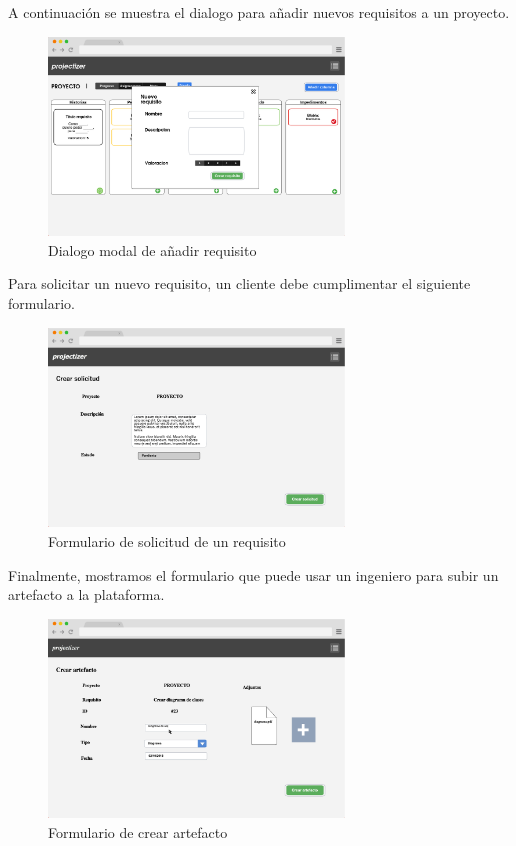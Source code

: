 \documentclass[a4paper, spanish]{article}
\begin{document}
A continuación se muestra el dialogo para añadir nuevos requisitos a un proyecto.
\begin{figure}[h!]
\centering
\includegraphics[width=0.7\textwidth]{maquetas/requisitos.png}
\caption{Dialogo modal de añadir requisito}\label{fig:maquetarequisito}
\end{figure}

Para solicitar un nuevo requisito, un cliente debe cumplimentar el siguiente formulario.
\begin{figure}[h!]
\centering
\includegraphics[width=0.7\textwidth]{maquetas/solicitudes.png}
\caption{Formulario de solicitud de un requisito}\label{fig:maquetasolicitud}
\end{figure}

Finalmente, mostramos el formulario que puede usar un ingeniero para subir un artefacto a la plataforma.
\begin{figure}[h!]
\centering
\includegraphics[width=0.7\textwidth]{maquetas/artefactos.png}
\caption{Formulario de crear artefacto}\label{fig:maquetaartefacto}
\end{figure}
\end{document}
